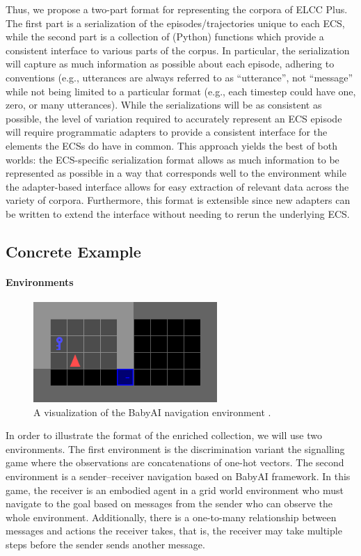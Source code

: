 Thus, we propose a two-part format for representing the corpora of ELCC Plus.
The first part is a serialization of the episodes/trajectories unique to each ECS, while the second part is a collection of (Python) functions which provide a consistent interface to various parts of the corpus.
In particular, the serialization will capture as much information as possible about each episode, adhering to conventions (e.g., utterances are always referred to as ``utterance'', not ``message'' while not being limited to a particular format (e.g., each timestep could have one, zero, or many utterances).
While the serializations will be as consistent as possible, the level of variation required to accurately represent an ECS episode will require programmatic adapters to provide a consistent interface for the elements the ECSs do have in common.
This approach yields the best of both worlds:
  the ECS-specific serialization format allows as much information to be represented as possible in a way that corresponds well to the environment while the adapter-based interface allows for easy extraction of relevant data across the variety of corpora.
Furthermore, this format is extensible since new adapters can be written to extend the interface without needing to rerun the underlying ECS\@.


\subsection{Concrete Example}

\paragraph{Environments}

\begin{figure}
  \centering
  \includegraphics[height=1.5in]{chapters/elcc-plus/assets/babyai}
  \caption{A visualization of the BabyAI navigation environment \protect{}.}
\end{figure}

In order to illustrate the format of the enriched collection, we will use two environments.
The first environment is the discrimination variant the signalling game where the observations are concatenations of one-hot vectors.
The second environment is a sender--receiver navigation based on BabyAI framework.
In this game, the receiver is an embodied agent in a grid world environment who must navigate to the goal based on messages from the sender who can observe the whole environment.
Additionally, there is a one-to-many relationship between messages and actions the receiver takes, that is, the receiver may take multiple steps before the sender sends another message.



